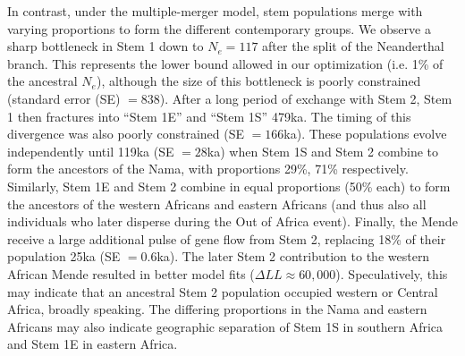 \documentclass[]{article}
\begin{document}
In contrast, under the multiple-merger model, stem populations merge with
varying proportions to form the different contemporary groups. 
We observe a sharp bottleneck in Stem 1 down to $N_e=117$ after the split of
the Neanderthal branch. This represents the lower bound allowed in our
optimization (i.e. 1\% of the ancestral $N_e$), although the size of this
bottleneck is poorly constrained (standard error (SE) $=838$). After a long period of
exchange with Stem 2, Stem 1 then fractures into ``Stem 1E'' and ``Stem 1S''
479ka. The timing of this divergence was also poorly constrained (SE $=166$ka).
These populations evolve independently until 119ka
(SE $=28$ka) when Stem 1S and Stem 2 combine to form the ancestors of the Nama, with
proportions 29\%, 71\% respectively. Similarly, Stem 1E and Stem 2 combine in
equal proportions (50\% each) to form the ancestors of the western Africans and
eastern Africans (and thus also all individuals who later disperse during the
Out of Africa event). Finally, the Mende receive a large additional pulse of
gene flow from Stem 2, replacing 18\% of their population 25ka (SE $=0.6$ka).
The later Stem 2 contribution to the western African Mende resulted in
better model fits ($\Delta LL \approx 60,000$).
Speculatively, this may indicate that an ancestral Stem 2 population occupied western or
Central Africa, broadly speaking. The differing proportions in the Nama and
eastern Africans may also indicate geographic separation of Stem 1S in southern
Africa and Stem 1E in eastern Africa. 
\end{document}
